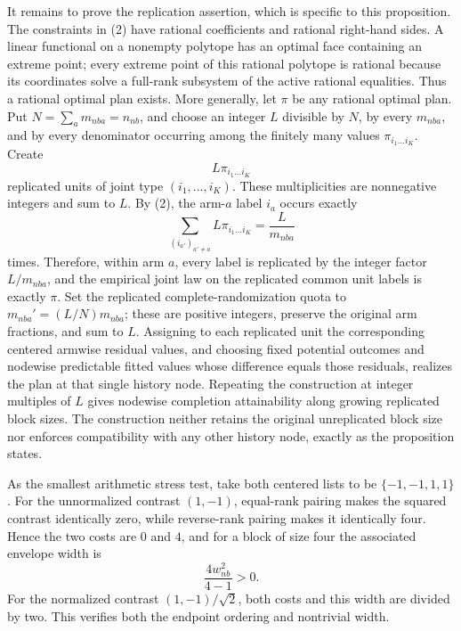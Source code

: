 It remains to prove the replication assertion, which is specific to this proposition. The constraints in (2) have rational coefficients and rational right-hand sides. A linear functional on a nonempty polytope has an optimal face containing an extreme point; every extreme point of this rational polytope is rational because its coordinates solve a full-rank subsystem of the active rational equalities. Thus a rational optimal plan exists. More generally, let \(\pi\) be any rational optimal plan. Put \(N=\sum_am_{nba}=n_{nb}\), and choose an integer \(L\) divisible by \(N\), by every \(m_{nba}\), and by every denominator occurring among the finitely many values \(\pi_{i_1\ldots i_K}\). Create
\[
L\pi_{i_1\ldots i_K}
\]
replicated units of joint type \((i_1,\ldots,i_K)\). These multiplicities are nonnegative integers and sum to \(L\). By (2), the arm-\(a\) label \(i_a\) occurs exactly
\[
\sum_{(i_{a'})_{a'\ne a}}L\pi_{i_1\ldots i_K}
=\frac{L}{m_{nba}}
\tag{3}
\]
times. Therefore, within arm \(a\), every label is replicated by the integer factor \(L/m_{nba}\), and the empirical joint law on the replicated common unit labels is exactly \(\pi\). Set the replicated complete-randomization quota to \(m_{nba}'=(L/N)m_{nba}\); these are positive integers, preserve the original arm fractions, and sum to \(L\). Assigning to each replicated unit the corresponding centered armwise residual values, and choosing fixed potential outcomes and nodewise predictable fitted values whose difference equals those residuals, realizes the plan at that single history node. Repeating the construction at integer multiples of \(L\) gives nodewise completion attainability along growing replicated block sizes. The construction neither retains the original unreplicated block size nor enforces compatibility with any other history node, exactly as the proposition states.

As the smallest arithmetic stress test, take both centered lists to be \(\{-1,-1,1,1\}\). For the unnormalized contrast \((1,-1)\), equal-rank pairing makes the squared contrast identically zero, while reverse-rank pairing makes it identically four. Hence the two costs are \(0\) and \(4\), and for a block of size four the associated envelope width is
\[
\frac{4w_{nb}^2}{4-1}>0.
\]
For the normalized contrast \((1,-1)/\sqrt2\), both costs and this width are divided by two. This verifies both the endpoint ordering and nontrivial width.